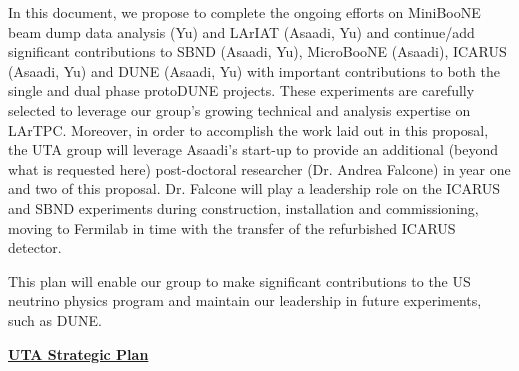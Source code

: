 In this document, we propose to complete the ongoing efforts on MiniBooNE beam dump data analysis (Yu) and LArIAT (Asaadi, Yu) and continue/add significant contributions to SBND (Asaadi, Yu), MicroBooNE (Asaadi), ICARUS (Asaadi, Yu) and DUNE (Asaadi, Yu) with important contributions to both the single and dual phase protoDUNE projects. These experiments are carefully selected to leverage our group's growing technical and analysis expertise on LArTPC. Moreover, in order to accomplish the work laid out in this proposal, the UTA group will leverage Asaadi's start-up to provide an additional (beyond what is requested here) post-doctoral researcher (Dr. Andrea Falcone) in year one and two of this proposal. Dr. Falcone will play a leadership role on the ICARUS and SBND experiments during construction, installation and commissioning, moving to Fermilab in time with the transfer of the refurbished ICARUS detector.

This plan will enable our group to make significant contributions to the US neutrino physics program and maintain our leadership in future experiments, such as DUNE.

\begin{center}
\textbf{\Large\underline{UTA Strategic Plan} }\label{sec:strategic-plan}
\end{center}


